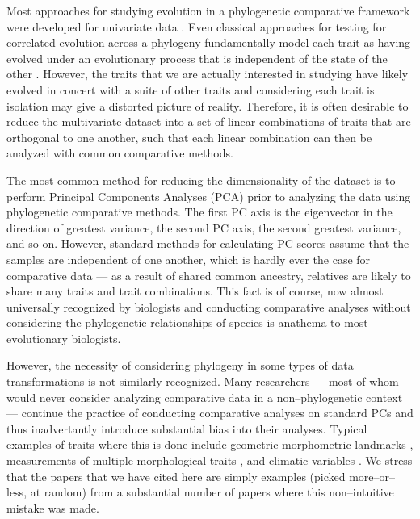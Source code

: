 \documentclass[a4paper,12pt]{article}
\begin{document}
Most approaches for studying evolution in a phylogenetic comparative framework were developed for univariate data \citep[reviewed in][]{PennellHarmon}. Even classical approaches for testing for correlated evolution across a phylogeny \citep[e.g.,][]{Felsenstein1985, Grafen1989, HarveyPagel1991} fundamentally model each trait as having evolved under an evolutionary process that is independent of the state of the other \citep{HansenOrzack2005}. However, the traits that we are actually interested in studying have likely evolved in concert with a suite of other traits and considering each trait is isolation may give a distorted picture of reality. Therefore, it is often desirable to reduce the multivariate dataset into a set of linear combinations of traits that are orthogonal to one another, such that each linear combination can then be analyzed with common comparative methods.

The most common method for reducing the dimensionality of the dataset is to perform Principal Components Analyses (PCA) prior to analyzing the data using phylogenetic comparative methods. The first PC axis is the eigenvector in the direction of greatest variance, the second PC axis, the second greatest variance, and so on. However, standard methods for calculating PC scores assume that the samples are independent of one another, which is hardly ever the case for comparative data --- as a result of shared common ancestry, relatives are likely to share many traits and trait combinations. This fact is of course, now almost universally recognized by biologists and conducting comparative analyses without considering the phylogenetic relationships of species is anathema to most evolutionary biologists. 

However, the necessity of considering phylogeny in some types of data transformations \citep{Revell2008} is not similarly recognized. Many researchers --- most of whom would never consider analyzing comparative data in a non--phylogenetic context --- continue the practice of conducting comparative analyses on standard PCs and thus inadvertantly introduce substantial bias into their analyses. Typical examples of traits where this is done include geometric morphometric landmarks \citep[e.g.,][]{Dornburg2011, Hunt2013}, measurements of multiple morphological traits \citep[e.g.,][]{Harmon2010, BergmannIrshick2012, Weir2012, Pienaar2013, Price2014}, and climatic variables \citep[e.g.,][]{KozakWiens2010, Schnitzler2012}. We stress that the papers that we have cited here are simply examples (picked more--or--less, at random) from a substantial number of papers where this non--intuitive mistake was made.
\end{document}

